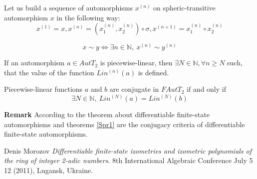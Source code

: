 \documentclass[12pt,fleqn,twoside]{article}
\begin{document}
Let us build a sequence of automorphisms $x^{(n)}$ on spheric-transitive automorphism $x$ in the following way:
$$x^{(1)}=x, 
x^{(n)}=(x_1^{(n)},x_2^{(n)})\circ \sigma, x^{(n+1)}=x_1^{(n)}\circ x_2^{(n)}$$

\begin{theorem}
 $$x\sim y  \Leftrightarrow \exists n\in \mathbb{N},\ x^{(n)} \sim y^{(n)} $$
\end{theorem}








\begin{lemma}
  If an automorphism $a\in Aut T_2$ is piecewise-linear, then
 $\exists N\in \mathbb{N}, \forall n \geqslant N $ such, that the value of the function $Lin^{(n)}(a)$ is defined.
 
\end{lemma}
\begin{theorem}\label{Spr1}
  Piecewise-linear functions $a$ and $b$  are conjugate in $FAut T_2$ if and only if
$$\exists N\in \mathbb{N},\ Lin^{(N)}(a) = Lin^{(N)}(b) $$
\end{theorem}
{\bf Remark} According to the theorem about differentiable finite-state automorphisms \cite{D46} and theorems \ref{Spr1} are the conjugacy criteria of differentiable finite-state  automorphisms.



\begin{thebibliography}{01}
\footnotesize
{} Denis Morozov
               \emph{Differentiable finite-state izometries and izometric
polynomials of the ring of integer 2-adic numbers}. 8th International Algebraic Conference 
July 5  12 (2011), Lugansk, Ukraine.
\end{thebibliography}
\end{document}
